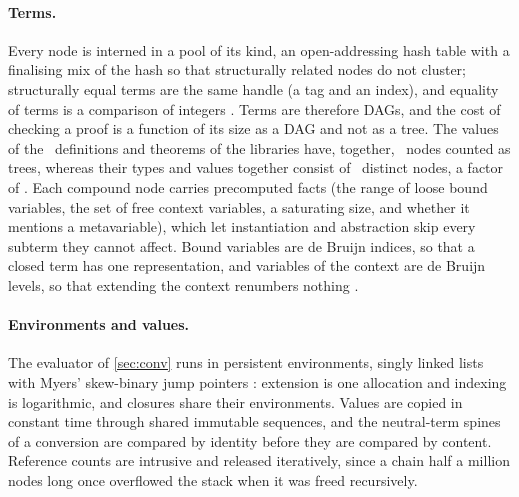 \paragraph{Terms.}
Every node is interned in a pool of its kind, an open-addressing hash table with a finalising mix of the hash so that structurally related nodes do not cluster; structurally equal terms are the same handle (a tag and an index), and equality of terms is a comparison of integers \citep{filliatre06}.
Terms are therefore DAGs, and the cost of checking a proof is a function of its size as a DAG and not as a tree.
The values of the \shareValues\ definitions and theorems of the libraries have, together, \shareTree\ nodes counted as trees, whereas their types and values together consist of \shareDistinct\ distinct nodes, a factor of \shareRatio.
Each compound node carries precomputed facts (the range of loose bound variables, the set of free context variables, a saturating size, and whether it mentions a metavariable), which let instantiation and abstraction skip every subterm they cannot affect.
Bound variables are de Bruijn indices, so that a closed term has one representation, and variables of the context are de Bruijn levels, so that extending the context renumbers nothing \citep{debruijn72,mcbride04,chargueraud12}.

\paragraph{Environments and values.}
The evaluator of \cref{sec:conv} runs in persistent environments, singly linked lists with Myers' skew-binary jump pointers \citep{myers83,okasaki95}: extension is one allocation and indexing is logarithmic, and closures share their environments.
Values are copied in constant time through shared immutable sequences, and the neutral-term spines of a conversion are compared by identity before they are compared by content.
Reference counts are intrusive and released iteratively, since a chain half a million nodes long once overflowed the stack when it was freed recursively.

